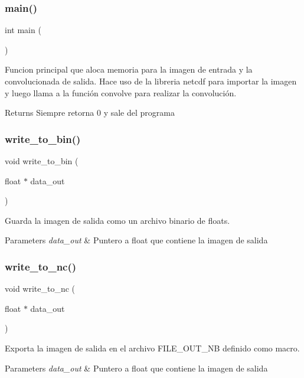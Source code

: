 \subsubsection{main()}
{\footnotesize\ttfamily int main (\begin{DoxyParamCaption}{ }\end{DoxyParamCaption})}



Funcion principal que aloca memoria para la imagen de entrada y la convolucionada de salida. Hace uso de la libreria netcdf para importar la imagen y luego llama a la función convolve para realizar la convolución. 

\begin{DoxyReturn}{Returns}
Siempre retorna 0 y sale del programa 
\end{DoxyReturn}
\mbox{\label{main_8c_a973ca89eb4aff25e00089eb1ebf64fd6}} 
\subsubsection{write\_to\_bin()}
{\footnotesize\ttfamily void write\+\_\+to\+\_\+bin (\begin{DoxyParamCaption}\item[{float $\ast$}]{data\+\_\+out }\end{DoxyParamCaption})}



Guarda la imagen de salida como un archivo binario de floats. 


\begin{DoxyParams}{Parameters}
{\em data\+\_\+out} & Puntero a float que contiene la imagen de salida \\
\hline
\end{DoxyParams}
\mbox{\label{main_8c_a4f8e9b2da505c680d5f11eeaff42c56c}} 
\subsubsection{write\_to\_nc()}
{\footnotesize\ttfamily void write\+\_\+to\+\_\+nc (\begin{DoxyParamCaption}\item[{float $\ast$}]{data\+\_\+out }\end{DoxyParamCaption})}



Exporta la imagen de salida en el archivo F\+I\+L\+E\+\_\+\+O\+U\+T\+\_\+\+NB definido como macro. 


\begin{DoxyParams}{Parameters}
{\em data\+\_\+out} & Puntero a float que contiene la imagen de salida \\
\hline
\end{DoxyParams}
